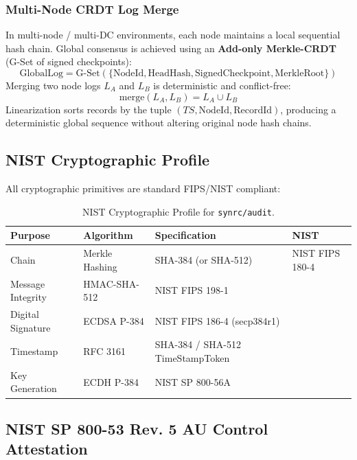 \documentclass{article}
\begin{document}
\subsubsection{Multi-Node CRDT Log Merge}
In multi-node / multi-DC environments, each node maintains a local sequential hash chain. Global consensus is achieved using an \textbf{Add-only Merkle-CRDT} (G-Set of signed checkpoints):
\begin{equation}
\text{GlobalLog} = \text{G-Set}\left( \{ \text{NodeId}, \text{HeadHash}, \text{SignedCheckpoint}, \text{MerkleRoot} \} \right)
\end{equation}
Merging two node logs $L_A$ and $L_B$ is deterministic and conflict-free:
\begin{equation}
\text{merge}(L_A, L_B) = L_A \cup L_B
\end{equation}
Linearization sorts records by the tuple $(TS, \text{NodeId}, \text{RecordId})$, producing a deterministic global sequence without altering original node hash chains.

\newpage
\subsection{NIST Cryptographic Profile}
All cryptographic primitives are standard FIPS/NIST compliant:
\begin{table}[ht!]
\centering
\begin{tabular}{llll}
\toprule
\textbf{Purpose} & \textbf{Algorithm} & \textbf{Specification}  & \textbf{NIST} \\
\midrule
Chain & Merkle Hashing & SHA-384 (or SHA-512) & NIST FIPS 180-4 \\
Message Integrity & HMAC-SHA-512 & NIST FIPS 198-1 \\
Digital Signature & ECDSA P-384 & NIST FIPS 186-4 (secp384r1) \\
Timestamp & RFC 3161 & SHA-384 / SHA-512 TimeStampToken \\
Key Generation & ECDH P-384 & NIST SP 800-56A \\
\bottomrule
\end{tabular}
\caption{NIST Cryptographic Profile for \texttt{synrc/audit}.}
\end{table}

\subsection{NIST SP 800-53 Rev. 5 AU Control Attestation}
\end{document}
